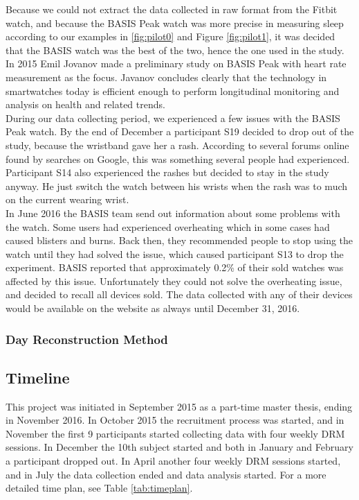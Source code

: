 \documentclass[12pt]{article} %
\begin{document}
Because we could not extract the data collected in raw format from the Fitbit watch, and because the BASIS Peak watch was more precise in measuring sleep according to our examples in \ref{fig:pilot0} and Figure \ref{fig:pilot1}, it was decided that the BASIS watch was the best of the two, hence the one used in the study. \\

In 2015 Emil Jovanov \cite{EmilBasis} made a preliminary study on BASIS Peak with heart rate measurement as the focus. Javanov concludes clearly that the technology in smartwatches today is efficient enough to perform longitudinal monitoring and analysis on health and related trends. \\

During our data collecting period, we experienced a few issues with the BASIS Peak watch. By the end of December a participant S19 decided to drop out of the study, because the wristband gave her a rash. According to several forums online found by searches on Google, this was something several people had experienced. Participant S14 also experienced the rashes but decided to stay in the study anyway. He just switch the watch between his wrists when the rash was to much on the current wearing wrist. \\

In June 2016 the BASIS team send out information about some problems with the watch. Some users had experienced overheating which in some cases had caused blisters and burns. Back then, they recommended people to stop using the watch until they had solved the issue, which caused participant S13 to drop the experiment. BASIS reported that approximately 0.2\% of their sold watches was affected by this issue. Unfortunately they could not solve the overheating issue, and decided to recall all devices sold. The data collected with any of their devices would be available on the website as always until December 31, 2016. 

\subsubsection{Day Reconstruction Method}

\subsection{Timeline}
This project was initiated in September 2015 as a part-time master thesis, ending in November 2016. In October 2015 the recruitment process was started, and in November the first 9 participants started collecting data with four weekly DRM sessions. In December the 10th subject started and both in January and February a participant dropped out. In April another four weekly DRM sessions started, and in July the data collection ended and data analysis started. For a more detailed time plan, see Table \ref{tab:timeplan}. 
\end{document}
